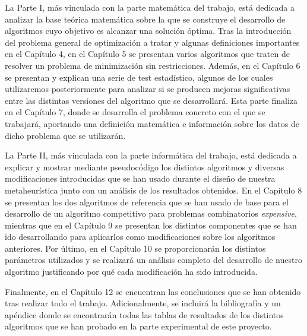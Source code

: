 La Parte I, más vinculada con la parte matemática del trabajo, está dedicada a analizar la base teórica matemática sobre la que se construye el desarrollo de algoritmos cuyo objetivo es alcanzar una solución óptima. 
Tras la introducción del problema general de optimización a tratar y algunas definiciones importantes en el Capítulo 4, en el Capítulo 5 se presentan varios algoritmos que traten de resolver un problema de minimización sin restricciones. 
Además, en el Capítulo 6 se presentan y explican una serie de test estadístico, algunos de los cuales utilizaremos posteriormente para analizar si se producen mejoras significativas entre las distintas versiones del algoritmo que se desarrollará. 
Esta parte finaliza en el Capítulo 7, donde se desarrolla el problema concreto con el que se trabajará, aportando una definición matemática e información sobre los datos de dicho problema que se utilizarán. 

La Parte II, más vinculada con la parte informática del trabajo, está dedicada a explicar y mostrar mediante pseudocódigo los distintos algoritmos y diversas modificaciones introducidas que se han usado durante el diseño de nuestra metaheurística junto con un análisis de los resultados obtenidos. 
En el Capítulo 8 se presentan los dos algoritmos de referencia que se han usado de base para el desarrollo de un algoritmo competitivo para problemas combinatorios \textit{expensive}, mientras que en el Capítulo 9 se presentan los distintos componentes que se han ido desarrollando para aplicarlos como modificaciones sobre los algoritmos anteriores. 
Por último, en el Capítulo 10 se proporcionarán los distintos parámetros utilizados y se realizará un análisis completo del desarrollo de nuestro algoritmo justificando por qué cada modificación ha sido introducida.

Finalmente, en el Capítulo 12 se encuentran las conclusiones que se han obtenido tras realizar todo el trabajo. 
Adicionalmente, se incluirá la bibliografía y un apéndice donde se encontrarán todas las tablas de resultados de los distintos algoritmos que se han probado en la parte experimental de este proyecto.